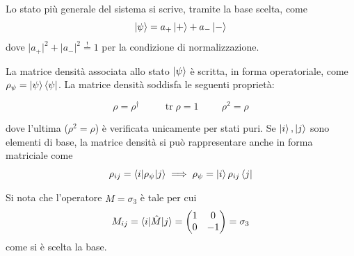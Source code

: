 \documentclass[11pt, a4paper]{scrartcl} %
\numberwithin{equation}{subsection}
\theoremstyle{style2}
\theoremstyle{style1}
\newenvironment{boxenv}[1][]{
    \begin{eqbox}[#1]
    }{
   \end{eqbox}
}
\begin{document}
Lo stato pi\`u generale del sistema si scrive, tramite la base scelta, come
\[
\ket{\psi } = a_+ \ket{+} + a_- \ket{-} 
\] 
dove $\lvert a_+ \rvert ^2 + \lvert a_- \rvert ^2 \stackrel{!}{=} 1$ per la condizione di normalizzazione.

La matrice densit\`a associata allo stato $\ket{\psi } $ \`e scritta, in forma operatoriale, come $\rho _\psi =\ket{\psi } \bra{\psi } $. 
La matrice densit\`a soddisfa le seguenti propriet\`a:
\begin{boxenv}[]
\begin{equation}
	\rho = \rho ^\dagger \hspace{1cm} \operatorname{tr}  \rho  =1 \hspace{1cm} \rho ^2 = \rho 
\end{equation}
\end{boxenv}
\noindent dove l'ultima ($\rho ^2 = \rho $) \`e verificata unicamente per stati puri.
Se $\ket{i} ,\ket{j} $ sono elementi di base, la matrice densit\`a si pu\`o rappresentare anche in forma matriciale come
\begin{equation}
	\rho _{ij} = \braket{i|\rho _\psi |j} \implies \rho _\psi = \ket{i} \rho _{ij} \bra{j} 
\end{equation}

Si nota che l'operatore $\hat{M}=\sigma _3$ \`e tale per cui 
\[
	M_{ij} = \braket{i|\hat{M}|j} = \begin{pmatrix} 1  & 0 \\ 0 & - 1 \end{pmatrix} = \sigma _3
\] 
come si \`e scelta la base.
\end{document}
